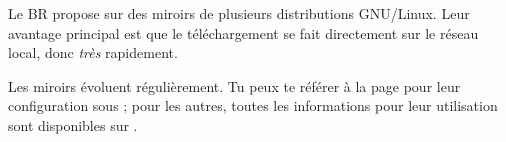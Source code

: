 Le BR propose sur  des miroirs de plusieurs distributions GNU/Linux. Leur avantage principal est que le téléchargement se fait directement sur le réseau local, donc \emph{très} rapidement.
% 

Les miroirs évoluent régulièrement. Tu peux te référer \`a la page \pageref{ubuntu_mirror} pour leur configuration sous  ;
pour les autres, toutes les informations pour leur utilisation sont disponibles sur .

